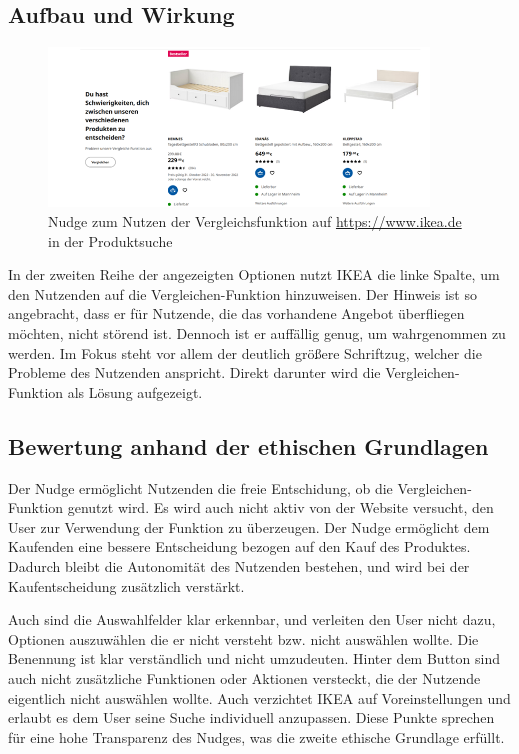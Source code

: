 \subsection{Aufbau und Wirkung}
\begin{figure}[ht]
    \centering
    \includegraphics[width=0.9\textwidth]{Bilder/Ikea_Nudge.png}
    \caption{Nudge zum Nutzen der Vergleichsfunktion auf \url{https://www.ikea.de} in der Produktsuche}
    \label{fig:Ikea-Nudge}
\end{figure}
In der zweiten Reihe der angezeigten Optionen nutzt IKEA die linke Spalte, um den Nutzenden auf die Vergleichen-Funktion hinzuweisen. Der Hinweis ist so angebracht, dass er für Nutzende, die das vorhandene Angebot überfliegen möchten, nicht störend ist. Dennoch ist er auffällig genug, um wahrgenommen zu werden. Im Fokus steht vor allem der deutlich größere Schriftzug, welcher die Probleme des Nutzenden anspricht. Direkt darunter wird die Vergleichen-Funktion als Lösung aufgezeigt.

\subsection{Bewertung anhand der ethischen Grundlagen}
Der Nudge ermöglicht Nutzenden die freie Entschidung, ob die Vergleichen-Funktion genutzt wird. Es wird auch nicht aktiv von der Website versucht, den User zur Verwendung der Funktion zu überzeugen. Der Nudge ermöglicht dem Kaufenden eine bessere Entscheidung bezogen auf den Kauf des Produktes. Dadurch bleibt die Autonomität des Nutzenden bestehen, und wird bei der Kaufentscheidung zusätzlich verstärkt.

Auch sind die Auswahlfelder klar erkennbar, und verleiten den User nicht dazu, Optionen auszuwählen die er nicht versteht bzw. nicht auswählen wollte. Die Benennung ist klar verständlich und nicht umzudeuten. Hinter dem Button sind auch nicht zusätzliche Funktionen oder Aktionen versteckt, die der Nutzende eigentlich nicht auswählen wollte. Auch verzichtet IKEA auf Voreinstellungen und erlaubt es dem User seine Suche individuell anzupassen. Diese Punkte sprechen für eine hohe Transparenz des Nudges, was die zweite ethische Grundlage erfüllt.

